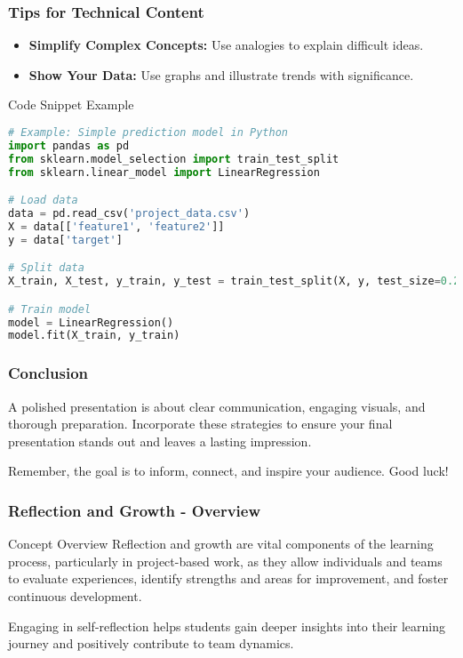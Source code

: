 \documentclass[aspectratio=169]{beamer}
\begin{document}
\begin{frame}[fragile]
    \frametitle{Tips for Technical Content}
    \begin{itemize}
        \item \textbf{Simplify Complex Concepts:} Use analogies to explain difficult ideas.
        \item \textbf{Show Your Data:} Use graphs and illustrate trends with significance.
    \end{itemize}

    \begin{block}{Code Snippet Example}
        \begin{lstlisting}[language=python]
# Example: Simple prediction model in Python
import pandas as pd
from sklearn.model_selection import train_test_split
from sklearn.linear_model import LinearRegression

# Load data
data = pd.read_csv('project_data.csv')
X = data[['feature1', 'feature2']]
y = data['target']

# Split data
X_train, X_test, y_train, y_test = train_test_split(X, y, test_size=0.2)

# Train model
model = LinearRegression()
model.fit(X_train, y_train)
        \end{lstlisting}
    \end{block}
\end{frame}

\begin{frame}
    \frametitle{Conclusion}
    A polished presentation is about clear communication, engaging visuals, and thorough preparation. Incorporate these strategies to ensure your final presentation stands out and leaves a lasting impression.
    
    Remember, the goal is to inform, connect, and inspire your audience. Good luck!
\end{frame}

\begin{frame}[fragile]
    \frametitle{Reflection and Growth - Overview}
    
    \begin{block}{Concept Overview}
        Reflection and growth are vital components of the learning process, particularly in project-based work, as they allow individuals and teams to evaluate experiences, identify strengths and areas for improvement, and foster continuous development.
    \end{block}
    
    Engaging in self-reflection helps students gain deeper insights into their learning journey and positively contribute to team dynamics.
\end{frame}
\end{document}
